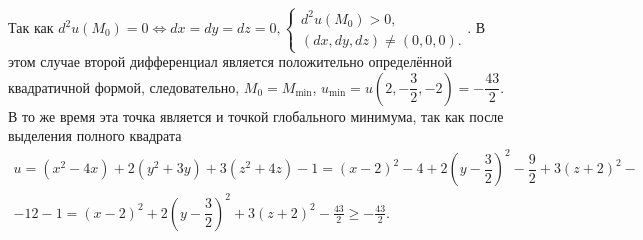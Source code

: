 \documentclass[../../main.tex]{subfiles}
\begin{document}
\begin{itemize}
Так как $d^2u(M_0)=0 \iff dx=dy=dz=0, 
\begin{cases}
d^2u(M_0)>0, \\
(dx, dy, dz) \ne (0,0,0).
\end{cases}$. В этом случае второй дифференциал является положительно
определённой квадратичной формой, следовательно, $M_0 = M_{\min}$, 
$u_{\min} = u\left(2, -\dfrac32, -2\right) = -\dfrac{43}2$. В то же время эта 
точка является и точкой глобального минимума, так как после выделения 
полного квадрата
\begin{multline*}
u = (x^2-4x) + 2(y^2+3y) + 3(z^2+4z)-1 = (x-2)^2 - 4 + 2\left(y-\dfrac32\right)^2 -
\dfrac92 + 3(z+2)^2 -\\- 12 - 1 = (x-2)^2 + 2\left(y-\dfrac32\right)^2 
+ 3(z+2)^2 - \frac{43}2 \geq -\frac{43}2.
\end{multline*}
\end{itemize}
\end{document}
